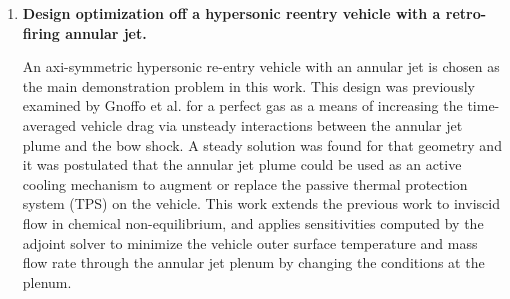 \begin{enumerate}
  \item {\bf Design optimization off a hypersonic reentry vehicle with a
    retro-firing annular jet.}

An axi-symmetric hypersonic re-entry vehicle with an annular jet is chosen as
the main demonstration problem in this work.  This design was previously
examined by Gnoffo et al.\cite{gnoffo2016tapping} for a perfect gas as a means
of increasing the time-averaged vehicle drag via unsteady interactions between
the annular jet plume and the bow shock.  A steady solution was found for that
geometry and it was postulated that the annular jet plume could be used as an
active cooling mechanism to augment or replace the passive thermal protection
system (TPS) on the vehicle.  This work extends the previous work to inviscid
flow in chemical non-equilibrium, and applies sensitivities computed by the
adjoint solver to minimize the vehicle outer surface temperature and mass flow
rate through the annular jet plenum by changing the conditions at the plenum.

\end{enumerate}
